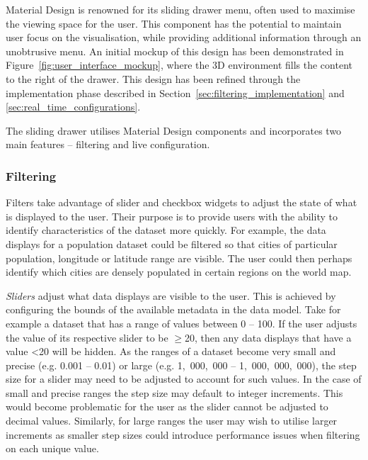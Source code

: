 {{		Material Design is renowned for its sliding drawer menu, often used to maximise the viewing space for the user. This component has the potential to maintain user focus on the visualisation, while providing additional information through an unobtrusive menu. An initial mockup of this design has been demonstrated in Figure~\ref{fig:user_interface_mockup}, where the 3D environment fills the content to the right of the drawer. This design has been refined through the implementation phase described in Section~\ref{sec:filtering_implementation} and \ref{sec:real_time_configurations}.

		

		The sliding drawer utilises Material Design components and incorporates two main features -- filtering and live configuration.

		\subsubsection{Filtering} {
		\label{sec:filtering}

			Filters take advantage of slider and checkbox widgets to adjust the state of what is displayed to the user. Their purpose is to provide users with the ability to identify characteristics of the dataset more quickly. For example, the data displays for a population dataset could be filtered so that cities of particular population, longitude or latitude range are visible. The user could then perhaps identify which cities are densely populated in certain regions on the world map. 

			\emph{Sliders} adjust what data displays are visible to the user. This is achieved by configuring the bounds of the available metadata in the data model. Take for example a dataset that has a range of values between 0 -- 100. If the user adjusts the value of its respective slider to be $\geqslant$20, then any data displays that have a value \textless20 will be hidden. As the ranges of a dataset become very small and precise (e.g. 0.001 -- 0.01) or large (e.g. 1,~000,~000 -- 1,~000,~000,~000), the step size for a slider may need to be adjusted to account for such values. In the case of small and precise ranges the step size may default to integer increments. This would become problematic for the user as the slider cannot be adjusted to decimal values. Similarly, for large ranges the user may wish to utilise larger increments as smaller step sizes could introduce performance issues when filtering on each unique value.
			
}}}

